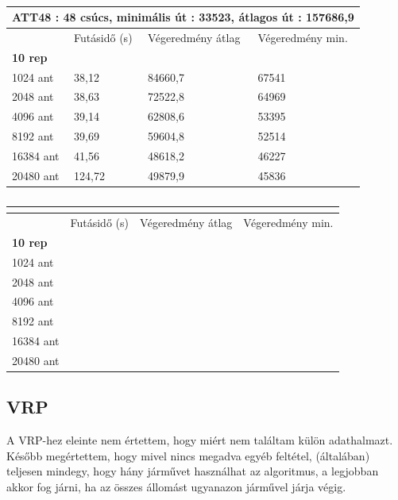 %


\begin{table}[htbp!]
	\centering
	\begin{tabular}{|p{2cm}||p{3cm}|p{3.5cm}|p{3.5cm}|}
		\hline
		\multicolumn{4}{|c|}{ATT48 : 48 csúcs, minimális út : 33523, átlagos út : 157686,9} \\
		\hline
		& Futásidő (s) & Végeredmény átlag & Végeredmény min.\\
		\hline
		\textbf{10 rep} & & & \\
		1024 ant & 38,12& 84660,7& 67541 \\
		2048 ant & 38,63 & 72522,8 & 64969 \\
		4096 ant &39,14&62808,6&53395 \\
		8192 ant & 39,69 & 59604,8 & 52514\\
		16384 ant & 41,56&48618,2&46227 \\
		20480 ant & 124,72 & 49879,9 & 45836\\
		\hline
	\end{tabular}
	\caption{}
	\label{table:TSPv2_48}
\end{table}

\begin{table}[ht!]
	\centering
	\begin{tabular}{|p{2cm}||p{3cm}|p{3.5cm}|p{3.5cm}|}
		\hline
		\multicolumn{4}{|c|}{} \\
		\hline
		& Futásidő (s) & Végeredmény átlag & Végeredmény min.\\
		\hline
		\textbf{10 rep} & \\
		1024 ant & \\
		2048 ant & \\
		4096 ant & \\
		8192 ant & \\
		16384 ant & \\
		20480 ant & \\
		\hline
	\end{tabular}
	\caption{}
	\label{table:TSPv2_empty}
\end{table}

\subsection{VRP}
A VRP-hez eleinte nem értettem, hogy miért nem találtam külön adathalmazt. Később megértettem, hogy mivel nincs megadva egyéb feltétel, (általában) teljesen mindegy, hogy hány járművet használhat az algoritmus, a legjobban akkor fog járni, ha az összes állomást ugyanazon járművel járja végig.


